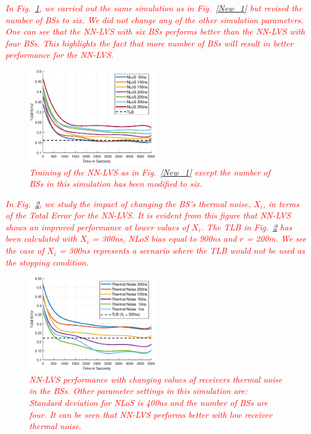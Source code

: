 \documentclass[journal]{IEEEtran}
\begin{document}
\textcolor{red}{\textit{In Fig.~\ref{New_3}, we carried out the same simulation as in Fig.~\ref{New_1} but revised the number of BSs to six. We did not change any of the other simulation parameters. One can see that the NN-LVS with six BSs performs better than the NN-LVS with four BSs. This highlights the fact that more number of BSs will result in better performance for the NN-LVS.}}

\begin{figure}[t!]
\includegraphics[width=0.50\textwidth]{7-T300-r200-V6-Exp-Changing-NLoS.eps}
\caption{\textcolor{red}{\textit{Training of the NN-LVS as in Fig.~\ref{New_1} except the number of BSs in this simulation has been modified to six.}}\label{New_3}}
\end{figure}

\textcolor{red}{\textit{In Fig.~\ref{New_6}, we study the impact of changing the BS's thermal noise, $X_i$, in terms of the Total Error for the NN-LVS. It is evident from this figure that NN-LVS shows an improved performance at lower values of $X_i$. The TLB in Fig.~\ref{New_6} has been calculated with $X_i$ = 300ns, NLoS bias equal to 900ns and $r$ = 200m. We see the case of $X_i$ = 300ns represents a scenario where the TLB would not be used as the stopping condition.}}

\begin{figure}[t!]
\includegraphics[width=0.50\textwidth]{7-N400-r200-V4-Exp-Changing-T.eps}
\caption{\textcolor{red}{\textit{NN-LVS performance with changing values of receivers thermal noise in the BSs. Other parameter settings in this simulation are: Standard deviation for NLoS is 400ns and the number of BSs are four. It can be seen that NN-LVS performs better with low receiver thermal noise.}}\label{New_6}}
\end{figure}
\end{document}
